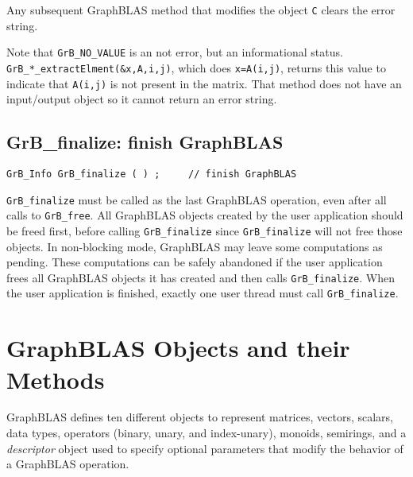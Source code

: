 \documentclass[12pt]{article}
\begin{document}
Any subsequent GraphBLAS method that modifies the object \verb'C' clears the
error string.

Note that \verb'GrB_NO_VALUE' is an not error, but an informational status.
\verb'GrB_*_extractElment(&x,A,i,j)', which does \verb'x=A(i,j)', returns this
value to indicate that \verb'A(i,j)' is not present in the matrix.  That
method does not have an input/output object so it cannot return an error
string.

\subsection{{\sf GrB\_finalize:} finish GraphBLAS} %
\label{finalize}

\begin{mdframed}[userdefinedwidth=6in]
{\footnotesize
\begin{verbatim}
GrB_Info GrB_finalize ( ) ;     // finish GraphBLAS
\end{verbatim}
}\end{mdframed}

\verb'GrB_finalize' must be called as the last GraphBLAS operation, even after
all calls to \verb'GrB_free'.  All GraphBLAS objects created by the user
application should be freed first, before calling \verb'GrB_finalize' since
\verb'GrB_finalize' will not free those objects.  In non-blocking mode,
GraphBLAS may leave some computations as pending.  These computations can be
safely abandoned if the user application frees all GraphBLAS objects it has
created and then calls \verb'GrB_finalize'.  When the user application is
finished, exactly one user thread must call \verb'GrB_finalize'.

\newpage
\section{GraphBLAS Objects and their Methods} %
\label{objects}

GraphBLAS defines ten different objects to represent matrices, vectors,
scalars, data types, operators (binary, unary, and index-unary), monoids,
semirings, and a {\em descriptor} object used to specify optional parameters
that modify the behavior of a GraphBLAS operation.
\end{document}
